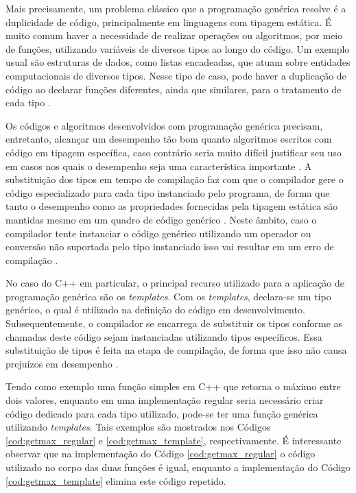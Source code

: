 Mais precisamente, um problema clássico que a programação genérica resolve é a
duplicidade de código, principalmente em linguagens com tipagem estática. É
muito comum haver a necessidade de realizar operações ou algoritmos, por meio de
funções, utilizando variáveis de diversos tipos ao longo do código. Um exemplo
usual são estruturas de dados, como listas encadeadas, que atuam sobre entidades
computacionais de diversos tipos. Nesse tipo de caso, pode haver a duplicação de
código ao declarar funções diferentes, ainda que similares, para o tratamento de
cada tipo \cite{alexandrescu_2001,stepanov_2015}.

Os códigos e algoritmos desenvolvidos com programação genérica precisam,
entretanto, alcançar um desempenho tão bom quanto algoritmos escritos com código
em tipagem específica, caso contrário seria muito difícil justificar seu uso em
casos nos quais o desempenho seja uma característica importante
\cite{stepanov_2015}. A substituição dos tipos em tempo de compilação faz com
que o compilador gere o código especializado para cada tipo instanciado pelo
programa, de forma que tanto o desempenho como as propriedades fornecidas pela
tipagem estática são mantidas mesmo em um quadro de código genérico
\cite{alexandrescu_2001}. Neste âmbito, caso o compilador tente instanciar o
código genérico utilizando um operador ou conversão não suportada pelo tipo
instanciado isso vai resultar em um erro de compilação \cite{bos_2019}.

No caso do C++ em particular, o principal recurso utilizado para a aplicação de
programação genérica são os \textit{templates}. Com os \textit{templates},
declara-se um tipo genérico, o qual é utilizado na definição do código em
desenvolvimento. Subsequentemente, o compilador se encarrega de substituir os
tipos conforme as chamadas deste código sejam instanciadas utilizando tipos
específicos. Essa substituição de tipos é feita na etapa de compilação, de forma
que isso não causa prejuízos em desempenho \cite{alexandrescu_2001}.

Tendo como exemplo uma função simples em C++ que retorna o máximo entre dois
valores, enquanto em uma implementação regular seria necessário criar código
dedicado para cada tipo utilizado, pode-se ter uma função genérica utilizando
\textit{templates}. Tais exemplos são mostrados nos Códigos
\ref{cod:getmax_regular} e \ref{cod:getmax_template}, respectivamente. É
interessante observar que na implementação do Código \ref{cod:getmax_regular} o
código utilizado no corpo das duas funções é igual, enquanto a
implementação do Código \ref{cod:getmax_template} elimina este código repetido.

